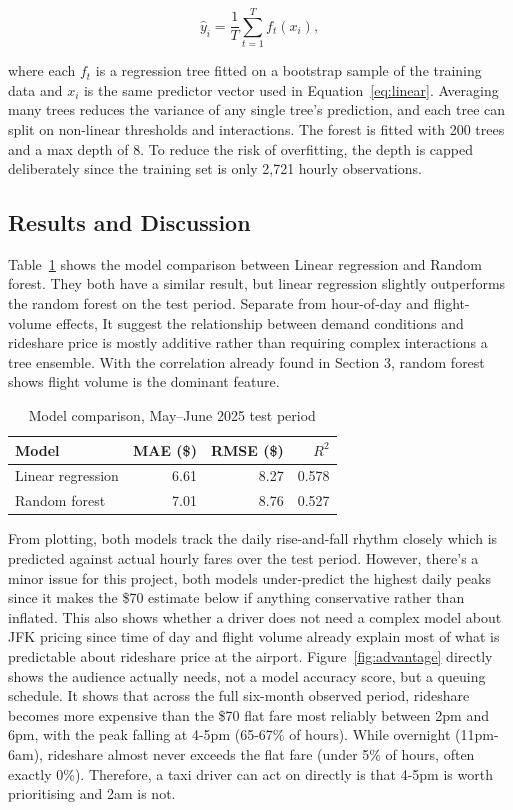 \documentclass[11pt]{article}
\begin{document}
\begin{equation}
\hat{y}_i = \frac{1}{T} \sum_{t=1}^{T} f_t(x_i),
\label{eq:forest}
\end{equation}

where each $f_t$ is a regression tree fitted on a bootstrap sample of the training
data and $x_i$ is the same predictor vector used in Equation~\ref{eq:linear}.
Averaging many trees reduces the variance of any single tree's prediction, and each
tree can split on non-linear thresholds and interactions. The forest is fitted with
200 trees and a max depth of 8. To reduce the risk of overfitting, the depth is
capped deliberately since the training set is only 2,721 hourly observations.

\subsection{Results and Discussion}

Table~\ref{tab:models} shows the model comparison between Linear regression and
Random forest. They both have a similar result, but linear regression slightly
outperforms the random forest on the test period. Separate from hour-of-day and
flight-volume effects, It suggest the relationship between demand conditions and
rideshare price is mostly additive rather than requiring complex interactions a tree
ensemble. With the correlation already found in Section 3, random forest shows flight
volume is the dominant feature.

\begin{table}[h]
\centering
\caption{Model comparison, May--June 2025 test period}
\label{tab:models}
\small
\begin{tabular}{lrrr}
\toprule
Model & MAE (\$) & RMSE (\$) & $R^2$ \\
\midrule
Linear regression & 6.61 & 8.27 & 0.578 \\
Random forest & 7.01 & 8.76 & 0.527 \\
\bottomrule
\end{tabular}
\end{table}

From plotting, both models track the daily rise-and-fall rhythm closely which is
predicted against actual hourly fares over the test period. However, there's a minor
issue for this project, both models under-predict the highest daily peaks since it
makes the \$70 estimate below if anything conservative rather than inflated. This
also shows whether a driver does not need a complex model about JFK pricing since
time of day and flight volume already explain most of what is predictable about
rideshare price at the airport. Figure~\ref{fig:advantage} directly shows the
audience actually needs, not a model accuracy score, but a queuing schedule. It
shows that across the full six-month observed period, rideshare becomes more
expensive than the \$70 flat fare most reliably between 2pm and 6pm, with the peak
falling at 4-5pm (65-67\% of hours). While overnight (11pm-6am), rideshare almost never exceeds the
flat fare (under 5\% of hours, often exactly 0\%). Therefore, a taxi driver can act
on directly is that 4-5pm is worth prioritising and 2am is not.
\end{document}
